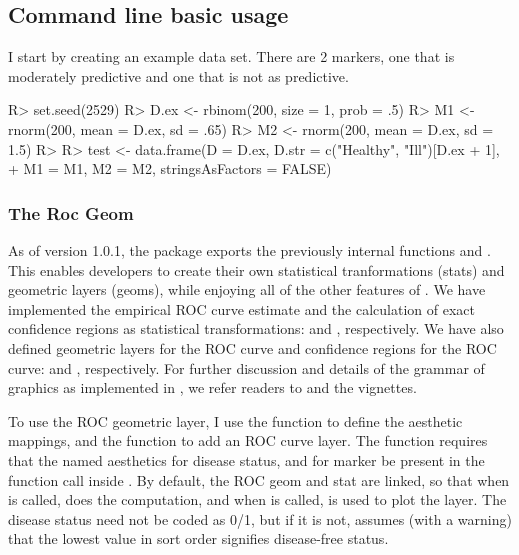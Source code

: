 \documentclass[codesnippet]{jss}
\begin{document}
\subsection{Command line basic usage}\label{command-line-basic-usage}

I start by creating an example data set. There are 2 markers, one that
is moderately predictive and one that is not as predictive.

\begin{Schunk}
\begin{Sinput}
R> set.seed(2529)
R> D.ex <- rbinom(200, size = 1, prob = .5)
R> M1 <- rnorm(200, mean = D.ex, sd = .65)
R> M2 <- rnorm(200, mean = D.ex, sd = 1.5)
R> 
R> test <- data.frame(D = D.ex, D.str = c("Healthy", "Ill")[D.ex + 1], 
+                    M1 = M1, M2 = M2, stringsAsFactors = FALSE)
\end{Sinput}
\end{Schunk}

\subsubsection{The Roc Geom}\label{the-roc-geom}

As of version 1.0.1, the  package \citep{ggplot2} exports
the previously internal functions  and . This
enables developers to create their own statistical tranformations
(stats) and geometric layers (geoms), while enjoying all of the other
features of . We have implemented the empirical ROC curve
estimate and the calculation of exact confidence regions as statistical
transformations:  and , respectively. We
have also defined geometric layers for the ROC curve and confidence
regions for the ROC curve:  and ,
respectively. For further discussion and details of the grammar of
graphics as implemented in , we refer readers to
\citet{wickham2010layered} and the  vignettes.

To use the ROC geometric layer, I use the  function to
define the aesthetic mappings, and the  function to add
an ROC curve layer. The  function requires that the named
aesthetics  for disease status, and  for marker be
present in the  function call inside . By
default, the ROC geom and stat are linked, so that when 
is called,  does the computation, and when
 is called,  is used to plot the layer.
The disease status need not be coded as 0/1, but if it is not,
 assumes (with a warning) that the lowest value in sort
order signifies disease-free status.
\end{document}
